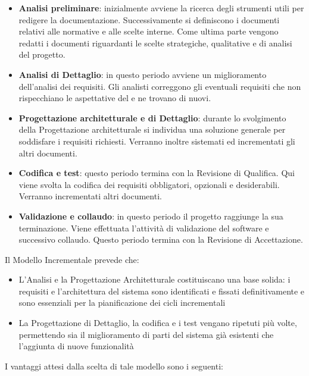 \begin{itemize}
	\item \textbf{Analisi preliminare}: inizialmente avviene la ricerca degli strumenti utili per redigere la documentazione. Successivamente si definiscono i documenti relativi alle normative e alle scelte interne. Come ultima parte vengono redatti i documenti riguardanti le scelte strategiche, qualitative e di analisi del progetto.
	\item \textbf{Analisi di Dettaglio}: in questo periodo avviene un miglioramento dell'analisi dei requisiti. Gli analisti correggono gli eventuali requisiti che non rispecchiano le aspettative del  e ne trovano di nuovi.
	\item \textbf{Progettazione architetturale e di Dettaglio}: durante lo svolgimento della Progettazione architetturale si individua una soluzione generale per soddisfare i requisiti richiesti. Verranno inoltre sistemati ed incrementati gli altri documenti.
	\item \textbf{Codifica e test}: questo periodo termina con la Revisione di Qualifica. Qui viene svolta la codifica dei requisiti obbligatori, opzionali e desiderabili. Verranno incrementati altri documenti. 
	\item \textbf{Validazione e collaudo}: in questo periodo il progetto raggiunge la sua terminazione. Viene effettuata l'attività di validazione del software e successivo collaudo. Questo periodo termina con la Revisione  di Accettazione. 
\end{itemize}

Il Modello Incrementale prevede che:
\begin{itemize}
\item L'Analisi e la Progettazione Architetturale costituiscano una base solida: i requisiti e l'architettura del sistema sono identificati e fissati definitivamente e sono essenziali per la pianificazione dei cicli incrementali
\item La Progettazione di Dettaglio, la codifica e i test vengano ripetuti più volte, permettendo sia il miglioramento di parti del sistema già esistenti che l'aggiunta di nuove funzionalità
\end{itemize}

I vantaggi attesi dalla scelta di tale modello sono i seguenti:


